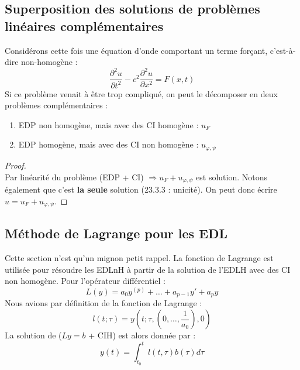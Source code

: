 \documentclass[11pt, a4paper, openany]{book}
\begin{document}
			\subsection{Superposition des solutions de problèmes linéaires complémentaires}
			Considérons cette fois une équation d'onde comportant un terme forçant, c'est-à-dire non-homogène :
			\begin{equation}
				\dfrac{\partial^2u}{\partial t^2} - c^2\dfrac{\partial^2u}{\partial x^2} = F(x,t)
			\end{equation}
			Si ce problème venait à être trop compliqué, on peut le décomposer en deux problèmes complémentaires :
			\begin{enumerate}
				\item EDP non homogène, mais avec des CI homogène : $u_F$
				\item EDP homogène, mais avec des CI non homogène : $u_{\varphi,\psi}$
			\end{enumerate}
			\begin{proof}
				\ \\
				Par linéarité du problème (EDP + CI) $\Rightarrow u_F + u_{\varphi,\psi}$ est solution. Notons également que c'est \textbf{la seule} solution (23.3.3 : unicité). On peut donc écrire $u = u_F + u_{\varphi,\psi}$.
			\end{proof}
																
			\subsection{Méthode de Lagrange pour les EDL}
			Cette section n'est qu'un mignon petit rappel. La fonction de Lagrange est utilisée pour résoudre les EDLnH à partir de la solution de l'EDLH avec des CI non homogène. Pour l'opérateur différentiel :
			\begin{equation}
				L(y) = a_0 y^{(p)} + \dots + a_{p-1}y' + a_p y
			\end{equation}
			Nous avions par définition de la fonction de Lagrange :
			\begin{equation}
				l(t;\tau) = y(t;\tau,(0,\dots, \frac{1}{a_0}),0)
			\end{equation}
			La solution de ($Ly = b$ + CIH) est alors donnée par :
			\begin{equation}
				y(t) = \int_{t_0}^t l(t,\tau)b(\tau)d\tau
			\end{equation}
																
\end{document}
